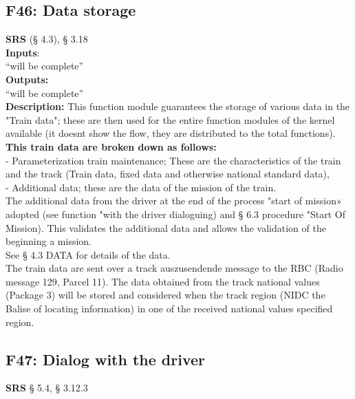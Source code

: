 \documentclass{template/openetcs_report}
\begin{document}
\subsection {F46: Data storage}
\textbf{SRS} (§ 4.3), § 3.18\\

\textbf{Inputs}:\\
``will be complete''\\
 
 \textbf{Outputs:}\\
 ``will be complete''\\
 
 \textbf{Description:} 
This function module guarantees the storage of various data in the 
"Train data"; these are then used for the entire function modules of the kernel available (it doesnt show the flow, they are distributed to the total functions).\\
 
\textbf{This train data are broken down as follows:}\\ 

- Parameterization train maintenance; These are the characteristics of the train and the track 
(Train data, fixed data and otherwise national standard data),\\
 
- Additional data; these are the data of the mission of the train. \\

The additional data from the driver at the end of the process "start of mission» 
adopted (see function "with the driver dialoguing) and § 6.3 procedure 
"Start Of Mission). This validates the additional data and allows the validation of the beginning 
a mission. \\

See § 4.3 DATA for details of the data. \\
The train data are sent over a track auszusendende message to the RBC 
(Radio message 129, Parcel 11). 
The data obtained from the track national values ​​(Package 3) will be stored and 
considered when the track region (NIDC the Balise of locating information) in one of the 
received national values ​​specified region.\\

\subsection {F47: Dialog with the driver}
\textbf{SRS} § 5.4, § 3.12.3\\
\end{document}
